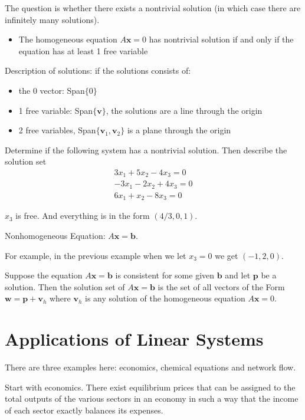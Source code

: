 \documentclass[../linalg.tex]{subfiles}
\begin{document}
The question is whether there exists a nontrivial solution (in which case there are infinitely many solutions). 
\begin{itemize}
    \item The homogeneous equation $A\textbf{x}=0$ has nontrivial solution if and only if the equation has at least 1 free variable 
\end{itemize}
Description of solutions: if the solutions consists of:
\begin{itemize}
    \item the 0 vector: Span$\{0\}$
    \item 1 free variable: Span$\{\textbf{v}\}$, the solutions are a line through the origin 
    \item 2 free variables, Span$\{\textbf{v}_1,\textbf{v}_2\}$ is a plane through the origin
\end{itemize}
\begin{example}
    Determine if the following system has a nontrivial solution. Then describe the solution set 
    \begin{align*}
    3x_1+5x_2-4x_3=0\\
    -3x_1-2x_2+4x_3=0\\
    6x_1+x_2-8x_3=0
    \end{align*}

    $x_3$ is free. And everything is in the form $(4/3, 0, 1)$.
\end{example}

Nonhomogeneous Equation: $A\textbf{x}=\textbf{b}$.

For example, in the previous example when we let $x_3=0$ we get $(-1,2,0)$. 

\begin{theorem}
    Suppose the equation $A\textbf{x}=\textbf{b}$ is consistent for some given $\textbf{b}$ and let $\textbf{p}$ be a solution. Then the solution set of 
    $A\textbf{x}=\textbf{b}$ is the set of all vectors of the Form $\textbf{w}=\textbf{p}+\textbf{v}_h$ where $\textbf{v}_h$ is any solution of the homogeneous equation $A\textbf{x}=0$.
\end{theorem}

\section{Applications of Linear Systems}
There are three examples here: economics, chemical equations and network flow.

Start with economics. There exist equilibrium prices that can be assigned to the total outputs of the various sectors in an economy in such a way that the income of each sector exactly balances its expenses.
\end{document}
